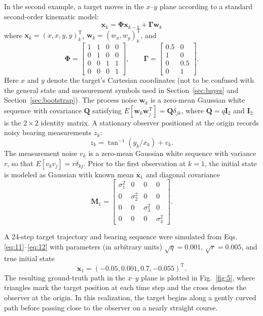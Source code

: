 In the second example, a target moves in the $x$–$y$ plane according to a standard second-order kinematic model:
\begin{equation}\label{eq:11}
\bm{x}_k = \bm{\Phi} \bm{x}_{k-1} + \bm{\Gamma} \bm{w}_k
\end{equation}
where $\bm{x}_k = (x, \dot{x}, y, \dot{y})_k^{\mathrm{T}}$, $\bm{w}_k = (w_x, w_y)_k^{\mathrm{T}}$, and
\begin{equation*}
\bm{\Phi} = \begin{bmatrix} 1 & 1 & 0 & 0 \\ 0 & 1 & 0 & 0 \\ 0 & 0 & 1 & 1 \\ 0 & 0 & 0 & 1 \end{bmatrix}, \qquad \bm{\Gamma} = \begin{bmatrix} 0.5 & 0 \\ 1 & 0 \\ 0 & 0.5 \\ 0 & 1 \end{bmatrix}.
\end{equation*}
Here $x$ and $y$ denote the target's Cartesian coordinates (not to be confused with the general state and measurement symbols used in Section~\ref{sec:bayes} and Section~\ref{sec:bootstrap}). The process noise $\bm{w}_k$ is a zero-mean Gaussian white sequence with covariance $\bm{Q}$ satisfying $E[\bm{w}_k \bm{w}_j^{\mathrm{T}}] = \bm{Q} \delta_{jk}$, where $\bm{Q} = q \bm{I}_2$ and $\bm{I}_2$ is the $2 \times 2$ identity matrix. A stationary observer positioned at the origin records noisy bearing measurements $z_k$:
\begin{equation}\label{eq:12}
z_k = \tan^{-1}(y_k / x_k) + v_k.
\end{equation}
The measurement noise $v_k$ is a zero-mean Gaussian white sequence with variance $r$, so that $E[v_k v_j] = r \delta_{kj}$. Prior to the first observation at $k = 1$, the initial state is modeled as Gaussian with known mean $\bar{\bm{x}}_1$ and diagonal covariance
\begin{equation*}
\bm{M}_1 = \begin{bmatrix} \sigma_1^2 & 0 & 0 & 0 \\ 0 & \sigma_2^2 & 0 & 0 \\ 0 & 0 & \sigma_3^2 & 0 \\ 0 & 0 & 0 & \sigma_4^2 \end{bmatrix}.
\end{equation*}

A 24-step target trajectory and bearing sequence were simulated from Eqs. \eqref{eq:11}–\eqref{eq:12} with parameters (in arbitrary units) $\sqrt{q} = 0.001$, $\sqrt{r} = 0.005$, and true initial state
\begin{equation*}
\bm{x}_1 = (-0.05, 0.001, 0.7, -0.055)^{\mathrm{T}}.
\end{equation*}
The resulting ground-truth path in the $x$–$y$ plane is plotted in Fig.~\ref{fig:5}, where triangles mark the target position at each time step and the cross denotes the observer at the origin. In this realization, the target begins along a gently curved path before passing close to the observer on a nearly straight course.

